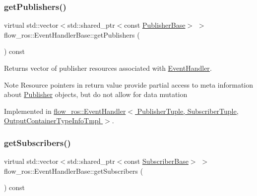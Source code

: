 \subsubsection{\texorpdfstring{get\+Publishers()}{getPublishers()}}
{\footnotesize\ttfamily virtual std\+::vector$<$std\+::shared\+\_\+ptr$<$const \hyperlink{classflow__ros_1_1_publisher_base}{Publisher\+Base}$>$ $>$ flow\+\_\+ros\+::\+Event\+Handler\+Base\+::get\+Publishers (\begin{DoxyParamCaption}{ }\end{DoxyParamCaption}) const\hspace{0.3cm}{\ttfamily [pure virtual]}}



Returns vector of publisher resources associated with \hyperlink{classflow__ros_1_1_event_handler}{Event\+Handler}. 

\begin{DoxyNote}{Note}
Resource pointers in return value provide partial access to meta information about \hyperlink{classflow__ros_1_1_publisher}{Publisher} objects, but do not allow for data mutation 
\end{DoxyNote}


Implemented in \hyperlink{classflow__ros_1_1_event_handler_ae786846cf4cf48b9b952265862e73ef1}{flow\+\_\+ros\+::\+Event\+Handler$<$ Publisher\+Tuple, Subscriber\+Tuple, Output\+Container\+Type\+Info\+Tmpl $>$}.

\mbox{\label{classflow__ros_1_1_event_handler_base_a5c6b2e230dcb308eff3f0aea18c47be3}} 
\subsubsection{\texorpdfstring{get\+Subscribers()}{getSubscribers()}}
{\footnotesize\ttfamily virtual std\+::vector$<$std\+::shared\+\_\+ptr$<$const \hyperlink{classflow__ros_1_1_subscriber_base}{Subscriber\+Base}$>$ $>$ flow\+\_\+ros\+::\+Event\+Handler\+Base\+::get\+Subscribers (\begin{DoxyParamCaption}{ }\end{DoxyParamCaption}) const\hspace{0.3cm}{\ttfamily [pure virtual]}}



